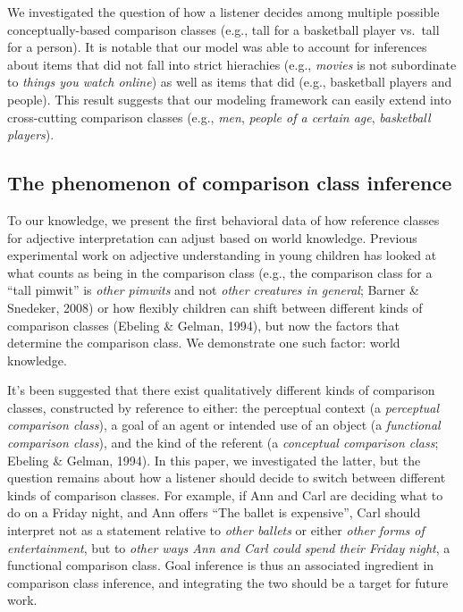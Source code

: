 \documentclass[doc]{apa6}
\begin{document}
We investigated the question of how a listener decides among multiple
possible conceptually-based comparison classes (e.g., tall for a
basketball player vs.~tall for a person). It is notable that our model
was able to account for inferences about items that did not fall into
strict hierachies (e.g., \emph{movies} is not subordinate to
\emph{things you watch online}) as well as items that did (e.g.,
basketball players and people). This result suggests that our modeling
framework can easily extend into cross-cutting comparison classes (e.g.,
\emph{men}, \emph{people of a certain age}, \emph{basketball players}).

\subsection{The phenomenon of comparison class
inference}

To our knowledge, we present the first behavioral data of how reference
classes for adjective interpretation can adjust based on world
knowledge. Previous experimental work on adjective understanding in
young children has looked at what counts as being in the comparison
class (e.g., the comparison class for a ``tall pimwit'' is \emph{other
pimwits} and not \emph{other creatures in general}; Barner \& Snedeker,
2008) or how flexibly children can shift between different kinds of
comparison classes (Ebeling \& Gelman, 1994), but now the factors that
determine the comparison class. We demonstrate one such factor: world
knowledge.

It's been suggested that there exist qualitatively different kinds of
comparison classes, constructed by reference to either: the perceptual
context (a \emph{perceptual comparison class}), a goal of an agent or
intended use of an object (a \emph{functional comparison class}), and
the kind of the referent (a \emph{conceptual comparison class}; Ebeling
\& Gelman, 1994). In this paper, we investigated the latter, but the
question remains about how a listener should decide to switch between
different kinds of comparison classes. For example, if Ann and Carl are
deciding what to do on a Friday night, and Ann offers ``The
ballet is expensive'', Carl should interpret not as a statement relative
to \emph{other ballets} or either \emph{other forms of entertainment},
but to \emph{other ways Ann and Carl could spend their Friday night}, a
functional comparison class. Goal inference is thus an associated
ingredient in comparison class inference, and integrating the two
should be a target for future work.
\end{document}
